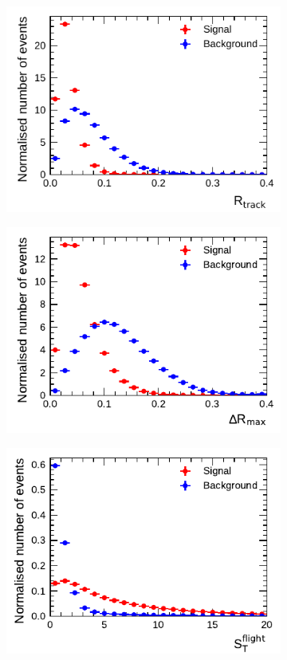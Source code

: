 \begin{figure}[htbp]
\begin{subfigure}{0.5\textwidth}
  \end{subfigure}
  \begin{subfigure}{0.5\textwidth}
    \centering
    \includegraphics{./figures/baseline_bdt_vars/3p/innerTrkAvgDist_fixed.pdf}
  \end{subfigure}%
  \begin{subfigure}{0.5\textwidth}
    \centering
    \includegraphics{./figures/baseline_bdt_vars/3p/dRmax.pdf}
  \end{subfigure}
  \begin{subfigure}{0.5\textwidth}
    \centering
    \includegraphics{./figures/baseline_bdt_vars/3p/trFlightPathSig.pdf}

\end{subfigure}
\end{figure}
